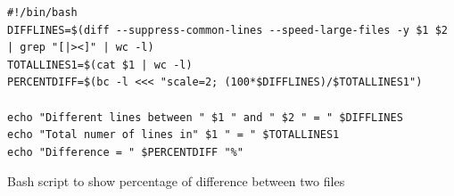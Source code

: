 \begin{listing}[ht]
	\begin{verbatim}
#!/bin/bash
DIFFLINES=$(diff --suppress-common-lines --speed-large-files -y $1 $2 | grep "[|><]" | wc -l)
TOTALLINES1=$(cat $1 | wc -l)
PERCENTDIFF=$(bc -l <<< "scale=2; (100*$DIFFLINES)/$TOTALLINES1")

echo "Different lines between " $1 " and " $2 " = " $DIFFLINES
echo "Total numer of lines in" $1 " = " $TOTALLINES1
echo "Difference = " $PERCENTDIFF "%"
	\end{verbatim}
	\caption{Bash script to show percentage of difference between two files}
	\label{lst:diff}
\end{listing}

